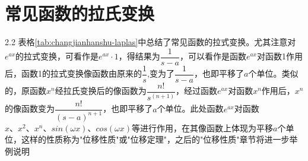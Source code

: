 \chapter{常见函数的拉氏变换}

\begin{table}[H]
	\centering
	\caption{常见函数的拉氏变换速查表}
	\label{tab:changjianhanshu-laplas}
	\renewcommand{\arraystretch}{1.25}
\end{table}

\vspace{-10pt}

\begin{spacing}{2.2}
	表格\ref{tab:changjianhanshu-laplas}中总结了常见函数的拉式变换。尤其注意对$e^{ax}$的拉式变换，可看作是$e^{ax}\cdot1$，得结果为$\dfrac{1}{s-a}$，可以看作是函数$e^{ax}$对函数1作用后，函数1的拉式变换像函数由原来的$\dfrac{1}{s}$,变为了$\dfrac{1}{s-a}$，也即平移了$a$个单位。类似的，原函数$x^{n}$经拉氏变换后的像函数为$\dfrac{n!}{s^{\left(n+1\right)}}$，经过函数$e^{ax}$对函数$x^{n}$作用后，$x^{n}$的像函数变为$\dfrac{n!}{\left(s-a\right)^{n+1}}$，也即平移了$a$个单位。此处函数$e^{ax}$对函数$x、x^{2}、x^{n}、sin\left(\omega x\right)、cos\left(\omega x\right)$等进行作用，在其像函数上体现为平移$a$个单位，这样的性质称为"位移性质"或"位移定理"，之后的"位移性质"章节将进一步举例说明
\end{spacing}

